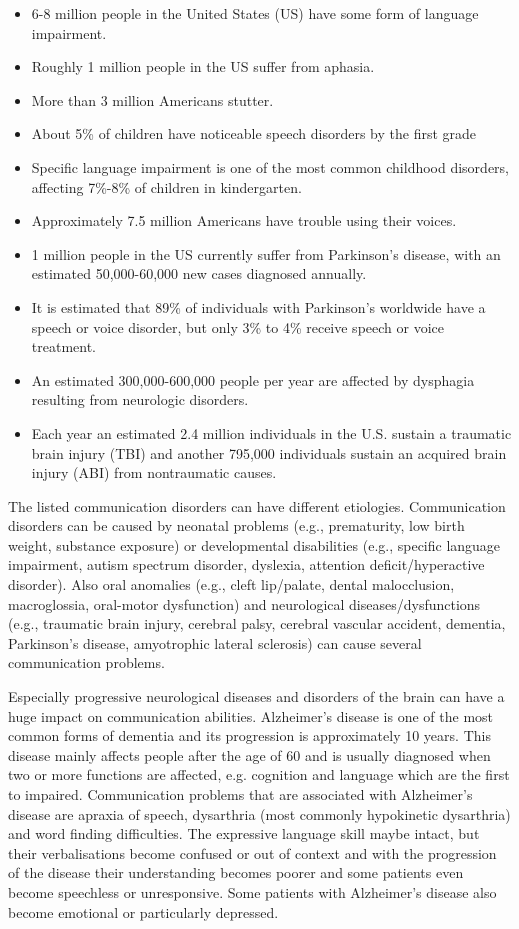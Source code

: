 \begin{itemize}
\item 6-8 million people in the United States (US) have some form of language impairment.
\item Roughly 1 million people in the US suffer from aphasia. 
\item More than 3 million Americans stutter. 
\item About 5\% of children have noticeable speech disorders by the first grade 
\item Specific language impairment is one of the most common childhood disorders, affecting 7\%-8\% of children in kindergarten. 
\item Approximately 7.5 million Americans have trouble using their voices.
\item 1 million people in the US currently suffer from Parkinson’s disease, with an estimated 50,000-60,000 new cases diagnosed annually. 
\item It is estimated that 89\% of individuals with Parkinson’s worldwide have a speech or voice disorder, but only 3\% to 4\% receive speech or voice treatment. 
\item An estimated 300,000-600,000 people per year are affected by dysphagia resulting from neurologic disorders. 
\item Each year an estimated 2.4 million individuals in the U.S. sustain a traumatic brain injury (TBI) and another 795,000 individuals sustain an acquired brain injury (ABI) from nontraumatic causes.
\end{itemize}

The listed communication disorders can have different etiologies. Communication disorders can be caused by neonatal problems (e.g., prematurity, low birth weight, substance exposure) or developmental disabilities (e.g., specific language impairment, autism spectrum disorder, dyslexia, attention deficit/hyperactive disorder). Also oral anomalies (e.g., cleft lip/palate, dental malocclusion, macroglossia, oral-motor dysfunction) and neurological diseases/dysfunctions (e.g., traumatic brain injury, cerebral palsy, cerebral vascular accident, dementia, Parkinson's disease, amyotrophic lateral sclerosis) can cause several communication problems.

Especially progressive neurological diseases and disorders of the brain can have a huge impact on communication abilities. Alzheimer's disease is one of the most common forms of dementia and its progression is approximately 10 years. This disease mainly affects people after the age of 60 and is usually diagnosed when two or more functions are affected, e.g. cognition and language which are the first to impaired. Communication problems that are associated with Alzheimer's disease are apraxia of speech, dysarthria (most commonly hypokinetic dysarthria)  and word finding difficulties. The expressive language skill maybe intact, but their verbalisations become confused or out of context and with the progression of the disease their understanding becomes poorer and some patients even become speechless or unresponsive. Some patients with Alzheimer's disease also become emotional or particularly depressed. \cite{communicationDifficulties} 
 
